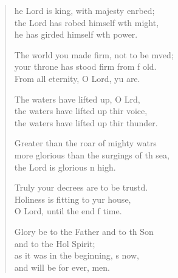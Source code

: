 \settowidth{\versewidth}{more glorious than the surgings of the sea, *}
\begin{verse}%
  \begin{patverse}
he Lord is king, with majesty enrbed;\Flex\\
    the Lord has robed himself w\pointup{\i}th might,\Med\\
    he has girded himself w\pointup{\i}th power.

The world you made firm, not to be mved;\Flex\\
    your throne has stood firm from f old.\Med\\
    From all eternity, O Lord, yu are.

The waters have lifted up, O Lrd,\Flex\\
    the waters have lifted up thir voice,\Med\\
    the waters have lifted up thir thunder.

Greater than the roar of mighty watrs\Flex\\
    more glorious than the surgings of th sea,\Med\\
    the Lord is glorious n high.

Truly your decrees are to be trustd.\Flex\\
    Holiness is fitting to yur house,\Med\\
    O Lord, until the end f time.

Glory be to the Father and to th Son\Med\\
    and to the Hol Spirit;\\
as it was in the beginning, \pointup{\i}s now,\Med\\
    and will be for ever, men.
  \end{patverse}
\end{verse}
